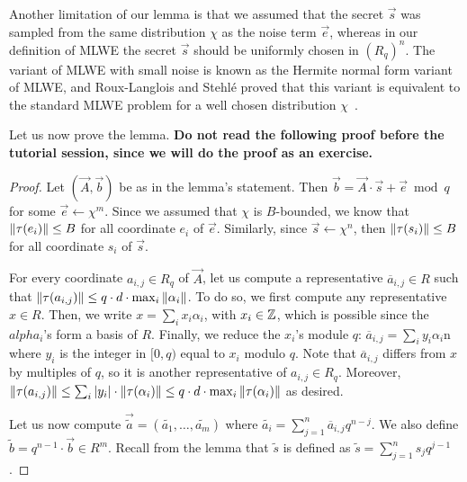 Another limitation of our lemma is that we assumed that the secret $\vec s$ was sampled from the same distribution $\chi$ as the noise term $\vec e$, whereas in our definition of MLWE the secret $\vec s$ should be uniformly chosen in $(R_q)^n$. The variant of MLWE with small noise is known as the Hermite normal form variant of MLWE, and Roux-Langlois and Stehlé proved that this variant is equivalent to the standard MLWE problem for a well chosen distribution $\chi$~\cite[Le. 4.24]{MLWE2}.

Let us now prove the lemma. \textbf{Do not read the following proof before the tutorial session, since we will do the proof as an exercise.}

\begin{proof}
Let $(\vec A, \vec b)$ be as in the lemma's statement. Then $\vec b = \vec A \cdot \vec s + \vec e \bmod q$ for some $\vec e \leftarrow \chi^m$. Since we assumed that $\chi$ is $B$-bounded, we know that $\|\tau(e_i)\| \leq B$ for all coordinate $e_i$ of $\vec e$. Similarly, since $\vec s \leftarrow \chi^n$, then $\|\tau(s_i)\| \leq B$ for all coordinate $s_i$ of $\vec s$.

For every coordinate $a_{i,j} \in R_q$ of $\vec A$, let us compute a representative $\overline{a}_{i,j} \in R$ such that $\|\tau(a_{i,j}) \| \leq q \cdot d \cdot \max_i \|\alpha_i\|$. To do so, we first compute any representative $x \in R$. Then, we write $x = \sum_i x_i \alpha_i$, with $x_i \in \mathbb{Z}$, which is possible since the $alpha_i$'s form a basis of $R$. Finally, we reduce the $x_i$'s module $q$: $\overline{a}_{i,j} = \sum_i y_i \alpha_i$n where $y_i$ is the integer in $[0,q)$ equal to $x_i$ modulo $q$. Note that $\overline{a}_{i,j}$ differs from $x$ by multiples of $q$, so it is another representative of $a_{i,j} \in R_q$. Moreover, $\|\tau(a_{i,j})\| \leq \sum_i |y_i| \cdot \|\tau(\alpha_i)\| \leq q \cdot d \cdot \max_i \|\tau(\alpha_i)\|$ as desired.

Let us now compute $\vec{\tilde{a}} = (\tilde{a_1}, \dots, \tilde{a_m})$ where $\tilde{a_i} = \sum_{j = 1}^n \overline{a}_{i,j} q^{n-j}$. 
We also define $\tilde{b} = q^{n-1} \cdot \vec b \in R^m$.
Recall from the lemma that $\tilde{s}$ is defined as $\tilde{s} = \sum_{j=1}^n s_j q^{j-1}$.


\end{proof}
